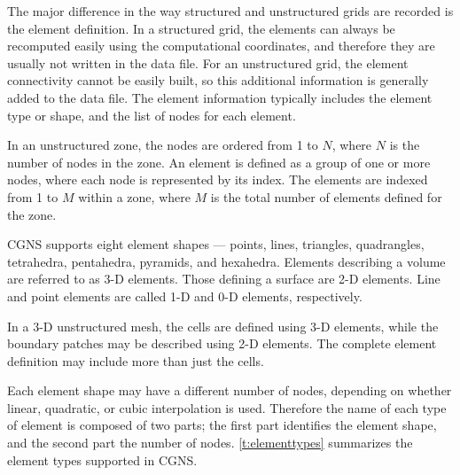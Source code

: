 {{{The major difference in the way structured and unstructured grids are
recorded is the element definition.
In a structured grid, the elements can always be recomputed easily
using the computational coordinates, and therefore they are usually
not written in the data file.
For an unstructured grid, the element connectivity cannot be easily
built, so this additional information is generally added to the data file.
The element information typically includes the element type or shape,
and the list of nodes for each element.

In an unstructured zone, the nodes are ordered from 1 to $N$, where $N$
is the number of nodes in the zone.
An element is defined as a group of one or more nodes, where each node
is represented by its index.
The elements are indexed from 1 to $M$ within a zone, where $M$
is the total number of elements defined for the zone.

CGNS supports eight element shapes --- points, lines, triangles,
quadrangles, tetrahedra, pentahedra, pyramids, and hexahedra.
Elements describing a volume are referred to as 3-D elements.
Those defining a surface are 2-D elements.
Line and point elements are called 1-D and 0-D elements, respectively.

In a 3-D unstructured mesh, the cells are defined using 3-D elements,
while the boundary patches may be described using 2-D elements.
The complete element definition may include more than just the cells.

Each element shape may have a different number of nodes, depending on
whether linear, quadratic, or cubic interpolation is used.
Therefore the name of each type of element is composed of two parts;
the first part identifies the element shape, and the second part the
number of nodes.
\autoref{t:elementtypes} summarizes the element types supported in CGNS.

}}}
